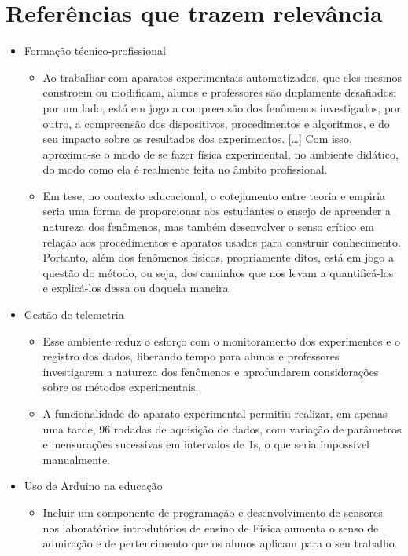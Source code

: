 \documentclass{article}
\begin{document}
\section{Referências que trazem relevância}
\begin{itemize}
	\item{Formação técnico-profissional}
	\begin{itemize}
		\item Ao trabalhar com aparatos experimentais automatizados, que eles mesmos constroem ou modificam, alunos e professores são duplamente desafiados: por um lado, está em jogo a compreensão dos fenômenos investigados, por outro, a compreensão dos dispositivos, procedimentos e algoritmos, e do seu impacto sobre os resultados dos experimentos. [\dots] Com isso, aproxima-se o modo de se fazer física experimental, no ambiente didático, do modo como ela é realmente feita no âmbito profissional. \cite{rogerio}
		\item Em tese, no contexto educacional, o cotejamento entre teoria e empiria seria uma
		forma de proporcionar aos estudantes o ensejo de apreender a natureza dos fenômenos,
		mas também desenvolver o senso crítico em relação aos procedimentos e aparatos usados
		para construir conhecimento. Portanto, além dos fenômenos físicos, propriamente ditos,
		está em jogo a questão do método, ou seja, dos caminhos que nos levam a quantificá-los
		e explicá-los dessa ou daquela maneira. \cite{rogerio}
	\end{itemize}
	\item{Gestão de telemetria}
	\begin{itemize}
		\item Esse ambiente reduz o esforço com o monitoramento dos experimentos e o registro dos dados, liberando tempo para alunos e professores investigarem a natureza dos fenômenos e aprofundarem considerações sobre os métodos experimentais. \cite{rogerio}
		\item A funcionalidade do aparato experimental permitiu realizar, em apenas uma tarde, 96 rodadas de aquisição de dados, com variação de parâmetros e mensurações sucessivas em intervalos de 1s, o que seria impossível manualmente. \cite{rogerio}
	\end{itemize}
	\item{Uso de Arduino na educação}
	\begin{itemize}
		\item Incluir um componente de programação e desenvolvimento de sensores nos laboratórios introdutórios de ensino de Física aumenta o senso de admiração e de pertencimento que os alunos aplicam para o seu trabalho. \cite{modelfor}

\end{itemize}
\end{itemize}
\end{document}
